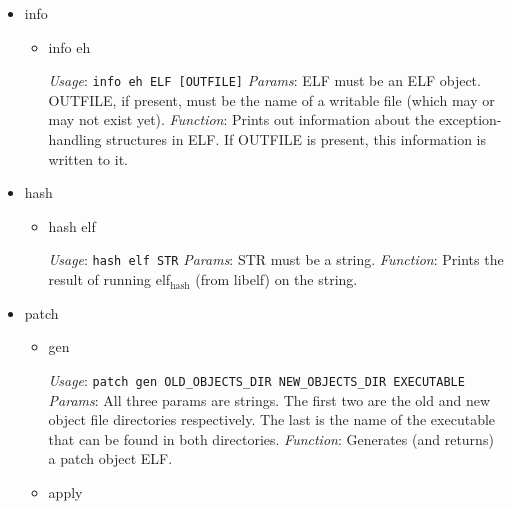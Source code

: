\documentclass[11pt]{article}
\begin{document}
\begin{itemize}
\item info\\
\label{sec-2.1.2.6}

\begin{itemize}

\item info eh\\
\label{sec-2.1.2.6.1}

      \emph{Usage}: \texttt{info eh ELF [OUTFILE]}
      \emph{Params}: ELF must be an ELF object. OUTFILE, if present, must
                be the name of a writable file (which may or may not
                exist yet). 
      \emph{Function}: Prints out information about the exception-handling
                  structures in ELF. If OUTFILE is present, this
                  information is written to it.
\end{itemize} %

\item hash\\
\label{sec-2.1.2.7}

\begin{itemize}

\item hash elf\\
\label{sec-2.1.2.7.1}

      \emph{Usage}: \texttt{hash elf STR}
      \emph{Params}: STR must be a string.
      \emph{Function}: Prints the result of running elf$_{\mathrm{hash}}$ (from libelf)
                  on the string.
                  
\end{itemize} %

\item patch\\
\label{sec-2.1.2.8}

\begin{itemize}

\item gen\\
\label{sec-2.1.2.8.1}

      \emph{Usage}: \texttt{patch gen OLD\_OBJECTS\_DIR NEW\_OBJECTS\_DIR EXECUTABLE}
      \emph{Params}: All three params are strings. The first two are the
                old and new object file directories respectively. The
                last is the name of the executable that can be found
                in both directories.
      \emph{Function}: Generates (and returns) a patch object ELF.

\item apply\\
\label{sec-2.1.2.8.2}


\end{itemize}
\end{itemize}
\end{document}
